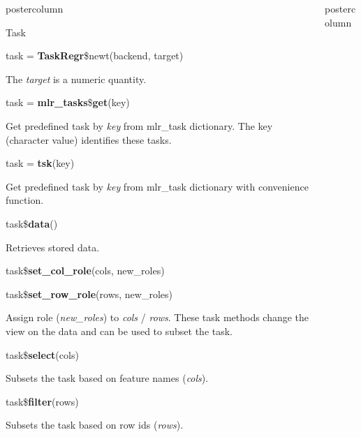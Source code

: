 \documentclass{beamer}
\begin{document}
\begin{frame}[fragile]{}
\begin{columns}
\begin{column}{.245\textwidth}
\begin{beamercolorbox}[center]{postercolumn}
\begin{minipage}{.98\textwidth}
{\begin{myblock}{Task}
						\\
						\begin{codebox}
							task = \textbf{TaskRegr}\$newt(backend, target)
						\end{codebox}
						The \textit{target} is a numeric quantity.
						\\
						\begin{codebox}
							task = \textbf{mlr\_tasks}\$\textbf{get}(key)
						\end{codebox}
						Get predefined task by \textit{key} from mlr\_task dictionary. The key (character value) identifies these tasks. 
						\\
						\begin{codebox}
							task = \textbf{tsk}(key)
						\end{codebox}
						Get predefined task by \textit{key} from mlr\_task dictionary with convenience function.
						\\
						\begin{codebox}
							task\$\textbf{data}()
						\end{codebox}
						Retrieves stored data.
						\\
						\begin{codebox}
							task\$\textbf{set\_col\_role}(cols, new\_roles)
						\end{codebox}
						\begin{codebox}
							task\$\textbf{set\_row\_role}(rows, new\_roles)
						\end{codebox}
						 Assign role (\textit{new\_roles}) to \textit{cols} / \textit{rows}. These task methods change the view on the data and can be used to subset the task.
						\\
						\begin{codebox}
							task\$\textbf{select}(cols)
						\end{codebox}
						Subsets the task based on feature names (\textit{cols}).
						\\
						\begin{codebox}
							task\$\textbf{filter}(rows)
						\end{codebox}
						Subsets the task based on row ids (\textit{rows}).
					\end{myblock}
					\vfill
				}
			\end{minipage}
		\end{beamercolorbox}
	\end{column}
	\begin{column}{.245\textwidth}
		\begin{beamercolorbox}[center]{postercolumn}

\end{beamercolorbox}
\end{column}
\end{columns}
\end{frame}
\end{document}
